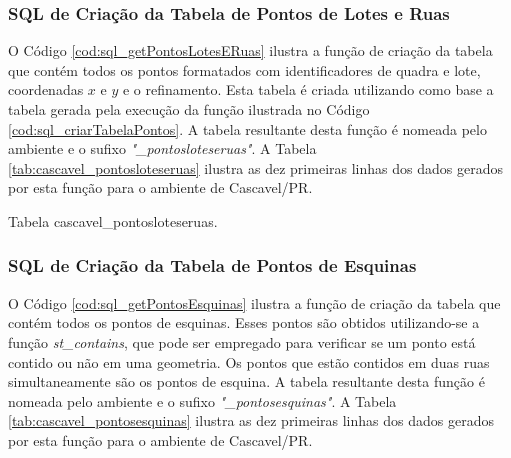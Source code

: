 \subsubsection{SQL de Criação da Tabela de Pontos de Lotes e Ruas}

O Código \ref{cod:sql_getPontosLotesERuas} ilustra a função de criação da tabela que contém todos os pontos formatados com identificadores de quadra e lote, coordenadas $x$ e $y$ e o refinamento. Esta tabela é criada utilizando como base a tabela gerada pela execução da função ilustrada no Código \ref{cod:sql_criarTabelaPontos}. A tabela resultante desta função é nomeada pelo ambiente e o sufixo \textit{"\_pontosloteseruas"}. A Tabela \ref{tab:cascavel_pontosloteseruas} ilustra as dez primeiras linhas dos dados gerados por esta função para o ambiente de Cascavel/PR.



\begin{table}[H]
\centering
{}
\caption{Tabela cascavel\_pontosloteseruas.}
\label{tab:cascavel_pontosloteseruas}
\end{table}

\subsubsection{SQL de Criação da Tabela de Pontos de Esquinas}

O Código \ref{cod:sql_getPontosEsquinas} ilustra a função de criação da tabela que contém todos os pontos de esquinas. Esses pontos são obtidos utilizando-se a função \textit{st\_contains}, que pode ser empregado para verificar se um ponto está contido ou não em uma geometria. Os pontos que estão contidos em duas ruas simultaneamente são os pontos de esquina. A tabela resultante desta função é nomeada pelo ambiente e o sufixo \textit{"\_pontosesquinas"}. A Tabela \ref{tab:cascavel_pontosesquinas} ilustra as dez primeiras linhas dos dados gerados por esta função para o ambiente de Cascavel/PR.




